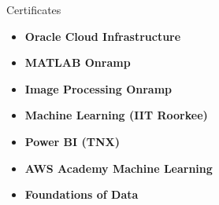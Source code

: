 \documentclass{resume} %
\begin{document}
\begin{rSection}{Certificates} 
\begin{itemize}
\item \textbf{Oracle Cloud Infrastructure}
\item \textbf{MATLAB Onramp}
\item \textbf{Image Processing Onramp}
\item \textbf{Machine Learning (IIT Roorkee)}
\item \textbf{Power BI (TNX)}
\item \textbf{AWS Academy Machine Learning}
\item \textbf{Foundations of Data}
\end{itemize}                  
\end{rSection}
\end{document}
